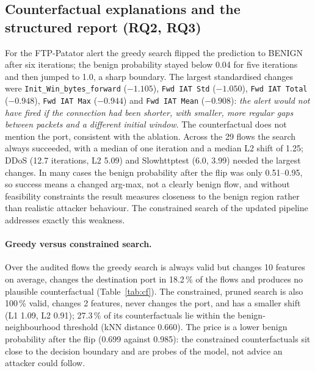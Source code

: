\documentclass[11pt,a4paper]{article}
\newcommand{\feat}[1]{\texttt{#1}}
\begin{document}
\subsection{Counterfactual explanations and the structured report (RQ2, RQ3)}
For the FTP-Patator alert the greedy search flipped the prediction to BENIGN after six iterations; the benign probability stayed below 0.04 for five iterations and then jumped to 1.0, a sharp boundary. The largest standardised changes were \feat{Init_Win_bytes_forward} ($-1.105$), \feat{Fwd IAT Std} ($-1.050$), \feat{Fwd IAT Total} ($-0.948$), \feat{Fwd IAT Max} ($-0.944$) and \feat{Fwd IAT Mean} ($-0.908$): \emph{the alert would not have fired if the connection had been shorter, with smaller, more regular gaps between packets and a different initial window}. The counterfactual does not mention the port, consistent with the ablation. Across the 29 flows the search always succeeded, with a median of one iteration and a median L2 shift of 1.25; DDoS (12.7 iterations, L2 5.09) and Slowhttptest (6.0, 3.99) needed the largest changes. In many cases the benign probability after the flip was only 0.51--0.95, so success means a changed arg-max, not a clearly benign flow, and without feasibility constraints the result measures closeness to the benign region rather than realistic attacker behaviour. The constrained search of the updated pipeline addresses exactly this weakness.

\paragraph{Greedy versus constrained search.} Over the audited flows the greedy search is always valid but changes 10 features on average, changes the destination port in 18.2\,\% of the flows and produces no plausible counterfactual (Table~\ref{tab:cf}). The constrained, pruned search is also 100\,\% valid, changes 2 features, never changes the port, and has a smaller shift (L1 1.09, L2 0.91); 27.3\,\% of its counterfactuals lie within the benign-neighbourhood threshold (kNN distance 0.660). The price is a lower benign probability after the flip (0.699 against 0.985): the constrained counterfactuals sit close to the decision boundary and are probes of the model, not advice an attacker could follow.
\end{document}
